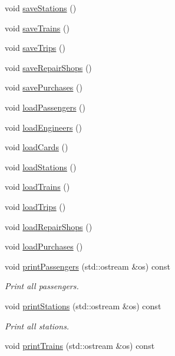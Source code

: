 \begin{DoxyCompactItemize}
\item 
void \mbox{\hyperlink{classSystem_a4c246427b8cb72dfe2d7db89d7144d3a}{save\+Stations}} ()
\item 
void \mbox{\hyperlink{classSystem_a83c5a9ae95096cbd03ba559b042ee5e1}{save\+Trains}} ()
\item 
void \mbox{\hyperlink{classSystem_ab0f54bdbc0d263d96d17e6fd38328c1e}{save\+Trips}} ()
\item 
void \mbox{\hyperlink{classSystem_a062c2502fcf944ecec0a84003042eecd}{save\+Repair\+Shops}} ()
\item 
void \mbox{\hyperlink{classSystem_a49f432c40f4b1a503416f47517264648}{save\+Purchases}} ()
\item 
void \mbox{\hyperlink{classSystem_a2e2da799ffbf2231bbc67eb4bc4ad4d8}{load\+Passengers}} ()
\item 
void \mbox{\hyperlink{classSystem_a68bb6ac77ce0de562c408968488037f9}{load\+Engineers}} ()
\item 
void \mbox{\hyperlink{classSystem_a32ef7e1c914ff8a237bc28de8c6aeedf}{load\+Cards}} ()
\item 
void \mbox{\hyperlink{classSystem_a017a8478b6ab45656f106cd2739848b4}{load\+Stations}} ()
\item 
void \mbox{\hyperlink{classSystem_a5c7631890b3099bf2c6d9ff10e25513b}{load\+Trains}} ()
\item 
void \mbox{\hyperlink{classSystem_a437952e6a2cde86e17a747c0e5500d2b}{load\+Trips}} ()
\item 
void \mbox{\hyperlink{classSystem_a53596ab10851974766ad4488375fdbb1}{load\+Repair\+Shops}} ()
\item 
void \mbox{\hyperlink{classSystem_a6dc7732405b691c4de1db0cc3626be49}{load\+Purchases}} ()
\item 
void \mbox{\hyperlink{classSystem_a1c5753d5c70d15dc3fe56fd5e421ba76}{print\+Passengers}} (std\+::ostream \&os) const
\begin{DoxyCompactList}\small\item\em Print all passengers. \end{DoxyCompactList}\item 
void \mbox{\hyperlink{classSystem_ac4b65c4fe2628e7d35b1027161e9d1da}{print\+Stations}} (std\+::ostream \&os) const
\begin{DoxyCompactList}\small\item\em Print all stations. \end{DoxyCompactList}\item 
void \mbox{\hyperlink{classSystem_af4610f38d80e01a18f2083a7c5fbd5ce}{print\+Trains}} (std\+::ostream \&os) const

\end{DoxyCompactItemize}
